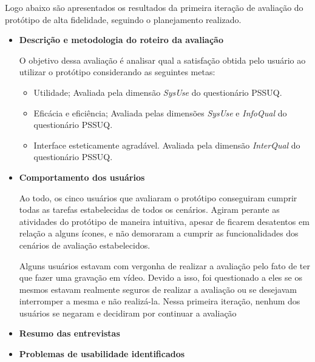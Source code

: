       Logo abaixo são apresentados os resultados da primeira iteração de avaliação do protótipo de alta fidelidade,
      seguindo o planejamento realizado.
      
      \begin{itemize}
       \item \textbf{Descrição e metodologia do roteiro da avaliação}
       
       \subitem O objetivo dessa avaliação é analisar qual a satisfação obtida pelo usuário ao utilizar o protótipo 
        considerando as seguintes metas:
       
	\begin{itemize}
	  \item Utilidade;
	    \subitem Avaliada pela dimensão \textit{SysUse} do questionário PSSUQ.
	    
	  \item Eficácia e eficiência;
	    \subitem Avaliada pelas dimensões \textit{SysUse} e \textit{InfoQual} do questionário PSSUQ.
	    
	  \item Interface esteticamente agradável.
	    \subitem Avaliada pela dimensão \textit{InterQual} do questionário PSSUQ.
	\end{itemize}
       
       \item \textbf{Comportamento dos usuários}
       
	  \subitem Ao todo, os cinco usuários que avaliaram o protótipo conseguiram cumprir todas as tarefas estabelecidas 
	  de todos os cenários. Agiram perante as atividades do protótipo de maneira intuitiva, apesar de ficarem 
	  desatentos em relação a alguns ícones, e não demoraram a cumprir as funcionalidades dos cenários de avaliação 
	  estabelecidos. 
	  
	  \subitem Alguns usuários estavam com vergonha de realizar a avaliação pelo fato de ter que fazer uma gravação em vídeo. 
	  Devido a isso, foi questionado a eles se os mesmos estavam realmente seguros de realizar a avaliação ou se desejavam 
	  interromper a mesma e não realizá-la. Nessa primeira iteração, nenhum dos usuários se negaram e decidiram por 
	  continuar a avaliação
       
       \item \textbf{Resumo das entrevistas}
       
	  \subitem 
	        
       \item \textbf{Problemas de usabilidade identificados}
       

\end{itemize}
